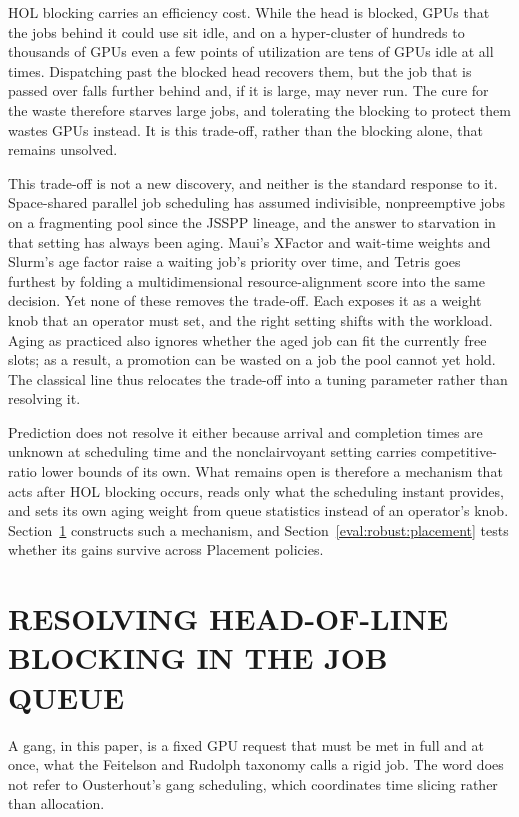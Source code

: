 \documentclass{ieeetj}
\begin{document}
HOL blocking carries an efficiency cost. While the head is blocked, GPUs that the jobs behind it could use sit idle, and on a hyper-cluster of hundreds to thousands of GPUs even a few points of utilization are tens of GPUs idle at all times. Dispatching past the blocked head recovers them, but the job that is passed over falls further behind and, if it is large, may never run. The cure for the waste therefore starves large jobs, and tolerating the blocking to protect them wastes GPUs instead. It is this trade-off, rather than the blocking alone, that remains unsolved.

This trade-off is not a new discovery, and neither is the standard response to it. Space-shared parallel job scheduling has assumed indivisible, nonpreemptive jobs on a fragmenting pool since the JSSPP lineage\cite{feitelson1996toward}, and the answer to starvation in that setting has always been aging. Maui's XFactor and wait-time weights\cite{jackson2001maui} and Slurm's age factor raise a waiting job's priority over time, and Tetris\cite{grandl2014multi} goes furthest by folding a multidimensional resource-alignment score into the same decision. Yet none of these removes the trade-off. Each exposes it as a weight knob that an operator must set, and the right setting shifts with the workload. Aging as practiced also ignores whether the aged job can fit the currently free slots; as a result, a promotion can be wasted on a job the pool cannot yet hold. The classical line thus relocates the trade-off into a tuning parameter rather than resolving it.

Prediction does not resolve it either because arrival and completion times are unknown at scheduling time and the nonclairvoyant setting carries competitive-ratio lower bounds of its own\cite{motwani1994nonclairvoyant}. What remains open is therefore a mechanism that acts after HOL blocking occurs, reads only what the scheduling instant provides, and sets its own aging weight from queue statistics instead of an operator's knob. Section~\ref{algo:intro} constructs such a mechanism, and Section~\ref{eval:robust:placement} tests whether its gains survive across Placement policies.

\section{RESOLVING HEAD-OF-LINE BLOCKING IN THE JOB QUEUE}\label{algo:intro}
A gang, in this paper, is a fixed GPU request that must be met in full and at once, what the Feitelson and Rudolph taxonomy\cite{feitelson1996toward} calls a rigid job. The word does not refer to Ousterhout's gang scheduling\cite{ousterhout1982gang}, which coordinates time slicing rather than allocation.
\end{document}
